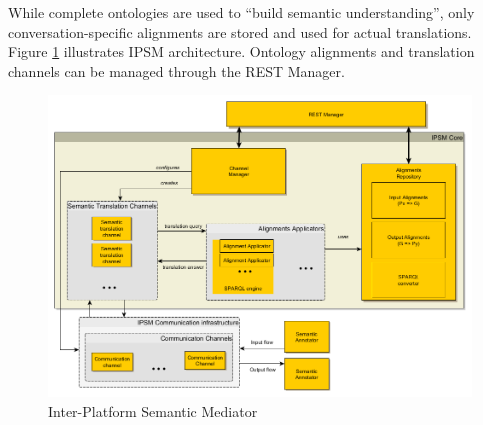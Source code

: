 \documentclass{sig-alternate-05-2015}
\begin{document}
While complete ontologies are used to “build semantic understanding”, only conversation-specific alignments are stored and used for actual translations. Figure \ref{fig:IPSM} illustrates IPSM architecture. Ontology alignments and translation channels can be managed through the REST Manager.




\begin{figure}[h!]
\centering
\includegraphics[scale=0.22]{IPSM}
\caption{Inter-Platform Semantic Mediator}
\label{fig:IPSM}
\end{figure}
\end{document}
